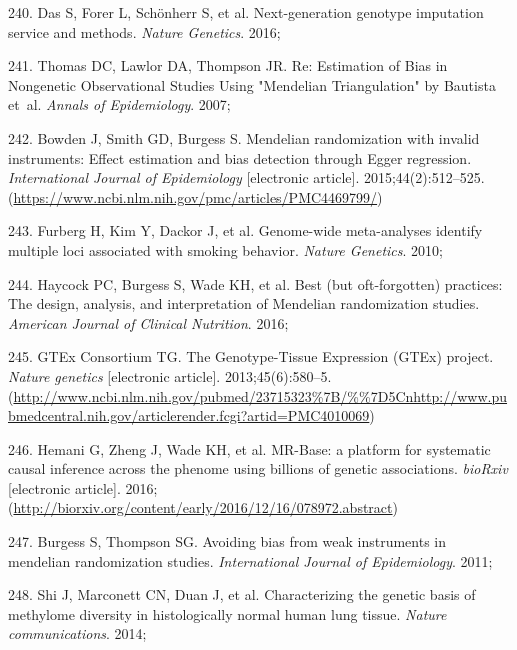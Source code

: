\documentclass[11pt,twoside]{bristolthesis}
\newenvironment{cslreferences}%
  {}%
  {\par}
\begin{document}
\begin{cslreferences}
\leavevmode\hypertarget{ref-Das2016}{}%
240. Das S, Forer L, Schönherr S, et al. Next-generation genotype imputation service and methods. \emph{Nature Genetics}. 2016;

\leavevmode\hypertarget{ref-Thomas2007}{}%
241. Thomas DC, Lawlor DA, Thompson JR. Re: Estimation of Bias in Nongenetic Observational Studies Using "Mendelian Triangulation" by Bautista et~al. \emph{Annals of Epidemiology}. 2007;

\leavevmode\hypertarget{ref-Bowden2015}{}%
242. Bowden J, Smith GD, Burgess S. Mendelian randomization with invalid instruments: Effect estimation and bias detection through Egger regression. \emph{International Journal of Epidemiology} {[}electronic article{]}. 2015;44(2):512--525. (\url{https://www.ncbi.nlm.nih.gov/pmc/articles/PMC4469799/})

\leavevmode\hypertarget{ref-Furberg2010}{}%
243. Furberg H, Kim Y, Dackor J, et al. Genome-wide meta-analyses identify multiple loci associated with smoking behavior. \emph{Nature Genetics}. 2010;

\leavevmode\hypertarget{ref-Haycock2016}{}%
244. Haycock PC, Burgess S, Wade KH, et al. Best (but oft-forgotten) practices: The design, analysis, and interpretation of Mendelian randomization studies. \emph{American Journal of Clinical Nutrition}. 2016;

\leavevmode\hypertarget{ref-GTExConsortium2013}{}%
245. GTEx Consortium TG. The Genotype-Tissue Expression (GTEx) project. \emph{Nature genetics} {[}electronic article{]}. 2013;45(6):580--5. (\url{http://www.ncbi.nlm.nih.gov/pubmed/23715323\%7B/\%\%7D5Cnhttp://www.pubmedcentral.nih.gov/articlerender.fcgi?artid=PMC4010069})

\leavevmode\hypertarget{ref-Hemani2016}{}%
246. Hemani G, Zheng J, Wade KH, et al. MR-Base: a platform for systematic causal inference across the phenome using billions of genetic associations. \emph{bioRxiv} {[}electronic article{]}. 2016;(\url{http://biorxiv.org/content/early/2016/12/16/078972.abstract})

\leavevmode\hypertarget{ref-Burgess2011}{}%
247. Burgess S, Thompson SG. Avoiding bias from weak instruments in mendelian randomization studies. \emph{International Journal of Epidemiology}. 2011;

\leavevmode\hypertarget{ref-Shi2014}{}%
248. Shi J, Marconett CN, Duan J, et al. Characterizing the genetic basis of methylome diversity in histologically normal human lung tissue. \emph{Nature communications}. 2014;


\end{cslreferences}
\end{document}

